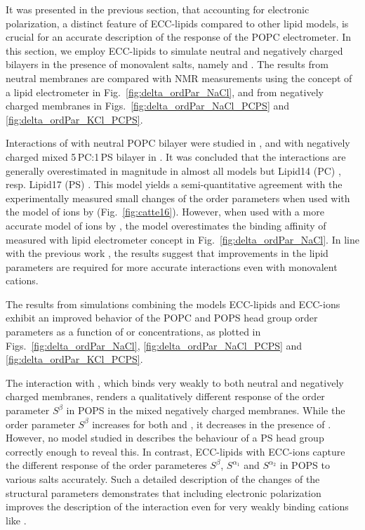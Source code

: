 It was presented in the previous section,
that accounting for electronic polarization,
a distinct feature of ECC-lipids compared to other lipid models, 
is crucial for an accurate description of the response of the POPC electrometer. 
In this section,
we employ ECC-lipids to simulate neutral and negatively charged bilayers 
in the presence of monovalent salts, namely  and . 
The results from neutral membranes are compared with NMR measurements using the concept of a lipid electrometer 
in Fig.~\ref{fig:delta_ordPar_NaCl}, 
and from negatively charged membranes in Figs.~\ref{fig:delta_ordPar_NaCl_PCPS} and \ref{fig:delta_ordPar_KCl_PCPS}. 

Interactions of  with neutral POPC bilayer were studied in \citep{catte16}, 
and with negatively charged mixed 5\,PC:1\,PS bilayer in \citep{nmrlipids_proj4}. 
It was concluded that the interactions are generally overestimated in magnitude in almost all models 
but Lipid14 (PC) \citep{dickson14}, resp. Lipid17 (PS) \citep{lipid17-future}. 
This model yields a semi-quantitative agreement with the experimentally measured small changes of the order parameters 
when used with the model of ions by \citet{aqvist90} (Fig.~\ref{fig:catte16}). 
However, when used with a more accurate model of ions by \citet{Pluharova2014, martinek17},
the model overestimates the binding affinity of 
measured with lipid electrometer concept in Fig.~\ref{fig:delta_ordPar_NaCl}. 
In line with the previous work \citep{catte16}, the results suggest that improvements 
in the lipid parameters are required for more accurate interactions even with monovalent cations. 

The results from simulations combining the models ECC-lipids \citep{melcr18} and ECC-ions \citep{martinek17, kohagen16, Pluharova2014} 
exhibit an improved behavior of the POPC and POPS head group order parameters as a function of  or  concentrations, 
as plotted in Figs.~\ref{fig:delta_ordPar_NaCl}, \ref{fig:delta_ordPar_NaCl_PCPS} and \ref{fig:delta_ordPar_KCl_PCPS}. 

The interaction with , which binds very weakly to both neutral and negatively charged membranes, 
renders a qualitatively different response of the order parameter $S^\beta$ in POPS in the mixed negatively charged membranes. 
While the order parameter $S^\beta$ increases for both  and ,
it decreases in the presence of .
However, no model studied in \citep{nmrlipids_proj4} describes the behaviour of a PS head group correctly enough to reveal this. 
In contrast, ECC-lipids with ECC-ions capture the different response of the order parameteres $S^{\beta}$, $S^{\alpha _1}$ and $S^{\alpha _2}$ in POPS to various salts accurately. 
Such a detailed description of the changes of the structural parameters 
demonstrates that including electronic polarization
improves the description of the interaction even for very weakly binding cations like . 



